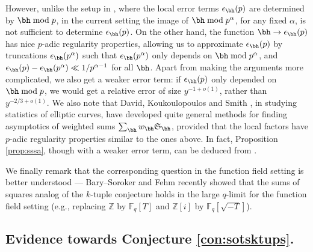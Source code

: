 \documentclass[12pt, reqno, twoside, letterpaper]{amsart}
\begin{document}
However, unlike the setup in \cite{KR:99,GK:08,KUR:09}, where the
local error terms $\epsilon_{\bh}(p)$ are determined by
$\bh \bmod p$, in the current setting the image of 
$\bh \bmod p^{\alpha}$, for any fixed $\alpha$, is not sufficient 
to determine $\epsilon_{\bh}(p)$.  
%
On the other hand, the function $\bh \to \epsilon_{\bh}(p)$ has 
nice $p$-adic regularity properties, allowing us to approximate
$\epsilon_{\bh}(p)$ by truncations 
$\epsilon_{\bh}(p^{\alpha})$ such that 
$\epsilon_{\bh}(p^{\alpha})$ only depends on 
$\bh \bmod p^{\alpha}$, and 
$
 \epsilon_{\bh}(p) - \epsilon_{\bh}(p^{\alpha}) 
  \ll 
   1/p^{\alpha - 1}
$ 
for all $\bh$.  
%
Apart from making the arguments more complicated, we also get
a weaker error term: if $\epsilon_{\bh}(p)$ only depended on
$\bh \bmod p$, we would get a relative error of size 
$y^{-1 + o(1)}$, rather than $y^{-2/3 + o(1)}$.
%
We also note that David, Koukoulopoulos and Smith \cite{DKS:15}, 
in studying statistics of elliptic curves, have developed quite 
general methods for finding asymptotics of weighted sums
$\sum_{\bh} w_{\bh} \mathfrak{S}_{\bh}$, provided that the local
factors have $p$-adic regularity properties similar to the ones
above. 
%
In fact, Proposition \ref{prop:sssa}, though with a weaker error 
term, can be deduced from \cite[Theorem 4.2]{DKS:15}.

We finally remark that the corresponding question in the function 
field setting is better understood --- Bary--Soroker and Fehm 
\cite{BS-F} recently showed that the sums of squares analog of the 
$k$-tuple conjecture holds in the large $q$-limit for the 
function field setting (e.g., replacing $\mathbb{Z}$ by 
$\mathbb{F}_{q}[T]$ and $\mathbb{Z}[i]$ by 
$\mathbb{F}_q[\sqrt{-T}]$).


\subsection{Evidence towards Conjecture \ref{con:sotsktups}.} 
 \label{sec:sotsHLktups}
\end{document}
